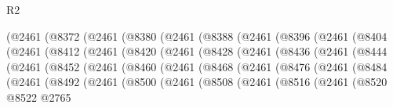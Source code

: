 \begin{lexlean}{R2}
\begin{coremodule}
              (@2461
                (@8372
                  (@2461
                    (@8380
                      (@2461
                        (@8388
                          (@2461
                            (@8396
                              (@2461
                                (@8404
                                  (@2461
                                    (@8412
                                      (@2461
                                        (@8420
                                          (@2461
                                            (@8428
                                              (@2461
                                                (@8436
                                                  (@2461
                                                    (@8444
                                                      (@2461
                                                        (@8452
                                                          (@2461
                                                            (@8460
                                                              (@2461
                                                                (@8468
                                                                  (@2461
                                                                    (@8476
                                                                      (@2461
                                                                        (@8484
                                                                          (@2461
                                                                            (@8492
                                                                              (@2461
                                                                                (@8500
                                                                                  (@2461
                                                                                    (@8508
                                                                                      (@2461
                                                                                        (@8516
                                                                                          (@2461
                                                                                            (@8520
                                                                                              @8522
                                                                                              @2765

\end{coremodule}
\end{lexlean}
